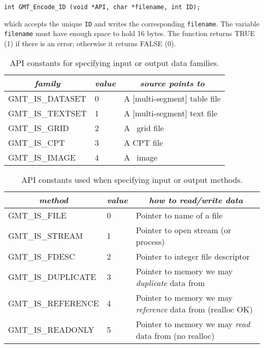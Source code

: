 \documentclass[11pt]{report}
\begin{document}
\begin{verbatim}
int GMT_Encode_ID (void *API, char *filename, int ID);
\end{verbatim}
which accepts the unique \texttt{ID} and writes the corresponding \texttt{filename}.
The variable \texttt{filename} must have enough space to hold 16 bytes.
The function returns TRUE (1) if there is an error; otherwise it returns FALSE (0).

\begin{table}[h]
\small
\centering
\begin{tabular}{|l|l|l|} \hline
\multicolumn{1}{|c|}{\emph{family}} & \multicolumn{1}{c|}{\emph{value}} & \multicolumn{1}{c|}{\emph{source points to}} \\ \hline
GMT\_IS\_DATASET	&	0	&	A [multi-segment] table file \\ \hline
GMT\_IS\_TEXTSET	&	1	&	A [multi-segment] text file \\ \hline
GMT\_IS\_GRID		&	2	&	A \GMT\ grid file \\ \hline
GMT\_IS\_CPT		&	3	&	A CPT file \\ \hline
GMT\_IS\_IMAGE		&	4	&	A \GMT\ image \\ \hline
\end{tabular}
\caption{API constants for specifying input or output data families.}
\label{tbl:family}
\end{table}


\begin{table}[h]
\small
\centering
\begin{tabular}{|l|l|l|} \hline
\multicolumn{1}{|c|}{\emph{method}} & \multicolumn{1}{c|}{\emph{value}} & \multicolumn{1}{c|}{\emph{how to read/write data}} \\ \hline
GMT\_IS\_FILE		&	0	&       Pointer to name of a file \\ \hline
GMT\_IS\_STREAM		&	1	&       Pointer to open stream (or process)  \\ \hline
GMT\_IS\_FDESC		&	2	&       Pointer to integer file descriptor \\ \hline
GMT\_IS\_DUPLICATE	&	3	&       Pointer to memory we may \emph{duplicate} data from \\ \hline
GMT\_IS\_REFERENCE	&	4	&       Pointer to memory we may \emph{reference} data from (realloc OK) \\ \hline
GMT\_IS\_READONLY	&	5	&       Pointer to memory we may \emph{read} data from (no realloc) \\ \hline
\end{tabular}
\caption{API constants used when specifying input or output methods.}
\label{tbl:methods}
\end{table}
\end{document}
